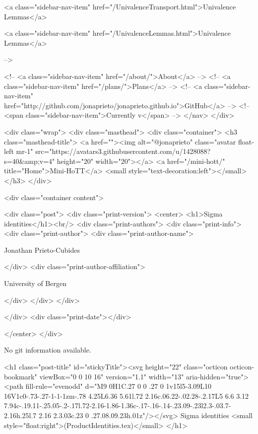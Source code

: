           <a class="sidebar-nav-item" href="/UnivalenceTransport.html">Univalence Lemmas</a>
        
      
    
      
        
          <a class="sidebar-nav-item" href="/UnivalenceLemmas.html">Univalence Lemmas</a>
        
      
     -->

    <!-- <a class="sidebar-nav-item" href="/about/">About</a> -->
    <!-- <a class="sidebar-nav-item" href="/plans/">Plans</a> -->
    <!-- <a class="sidebar-nav-item" href="http://github.com/jonaprieto/jonaprieto.github.io">GitHub</a> -->
    <!-- <span class="sidebar-nav-item">Currently v</span> -->
  </nav>
</div>

    <div class="wrap">
      <div class="masthead">
        <div class="container">
          <h3 class="masthead-title">
            <a href=""><img alt="@jonaprieto" class="avatar float-left mr-1" src="https://avatars3.githubusercontent.com/u/1428088?s=40&amp;v=4" height="20" width="20"></a>
            <a href="/mini-hott/" title="Home">Mini-HoTT</a>
            <small style="text-decoration:left"></small>
          </h3>
        </div>
      
      <div class="container content">
        







<div class="post">
  <div class="print-version">
    <center>
      <h1>Sigma identities</h1><br/>
        <div class="print-authors">
          <div class="print-info">
            <div class="print-author">
              <div class="print-author-name">
                
                  Jonathan Prieto-Cubides
                
              </div>
              <div class="print-author-affiliation">
                
                  University of Bergen
                
                </div>
            </div>
          </div>
          
          
        </div>
        <div class="print-date"></div>
        
        
    </center>
  </div>

  
  No git information available.
  

  <h1 class="post-title" id="stickyTitle"><svg height="22" class="octicon octicon-bookmark" viewBox="0 0 10 16" version="1.1" width="13" aria-hidden="true"><path fill-rule="evenodd" d="M9 0H1C.27 0 0 .27 0 1v15l5-3.09L10 16V1c0-.73-.27-1-1-1zm-.78 4.25L6.36 5.61l.72 2.16c.06.22-.02.28-.2.17L5 6.6 3.12 7.94c-.19.11-.25.05-.2-.17l.72-2.16-1.86-1.36c-.17-.16-.14-.23.09-.23l2.3-.03.7-2.16h.25l.7 2.16 2.3.03c.23 0 .27.08.09.23h.01z"/></svg> Sigma identities <small style="float:right">(ProductIdentities.tex)</small>
  </h1>

